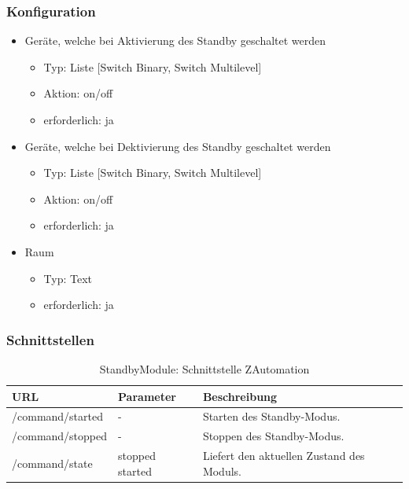 \subsubsection{Konfiguration}
\begin{itemize}
	\item Geräte, welche bei Aktivierung des Standby geschaltet werden
	\begin{itemize}
		\item 	Typ: Liste [Switch Binary, Switch Multilevel]
		\item Aktion: on/off 
		\item erforderlich: ja
	\end{itemize}
	\item Geräte, welche bei Dektivierung des Standby geschaltet werden
	\begin{itemize}
		\item 	Typ: Liste [Switch Binary, Switch Multilevel]
		\item Aktion: on/off 
		\item erforderlich: ja
	\end{itemize}
	\item Raum
	\begin{itemize}
		\item Typ: Text
		\item erforderlich: ja
	\end{itemize}
\end{itemize}

\subsubsection{Schnittstellen}
\begin{table}[H]
	\begin{tabularx}{\textwidth}{
			>{\hsize=1.25\hsize}X %
			>{\hsize=0.5\hsize\centering}X %
			>{\hsize=1.25\hsize}X %
		}
		\hline
		\textbf{URL}						& \textbf{Parameter}	& \textbf{Beschreibung} \\
		\hline /command/started				& - 					& Starten des Standby-Modus. \\ 
		\hline /command/stopped				& - 			 		& Stoppen des Standby-Modus. \\
		\hline /command/state				& stopped started	& Liefert den aktuellen Zustand des Moduls. \\
		\hline
	\end{tabularx}
	\caption{StandbyModule: Schnittstelle ZAutomation}
\end{table}

